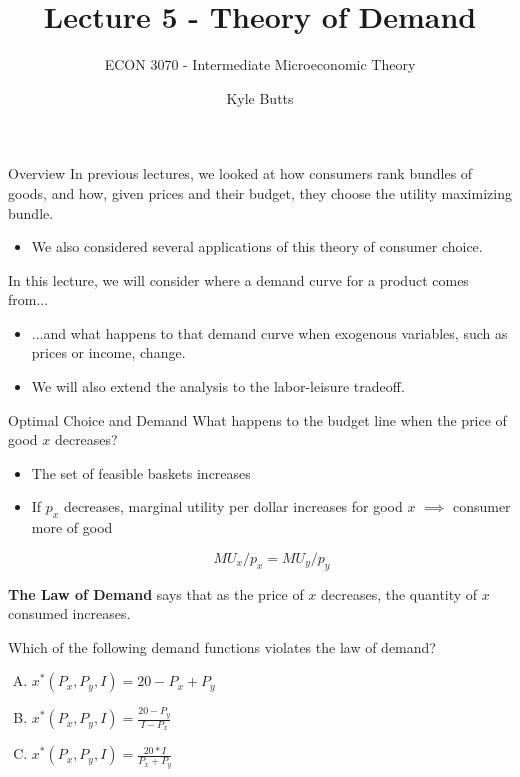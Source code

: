 \documentclass[11pt,t]{beamer}
\author{Kyle Butts}
\title{Lecture 5  - Theory of Demand}
\subtitle{ECON 3070 - Intermediate Microeconomic Theory}
\begin{document}
\begin{frame}
\titlepage
\end{frame}


\begin{frame}{Overview}
  In previous lectures, we looked at how consumers rank bundles of goods, and how, given prices and their budget, they choose the utility maximizing bundle.

  \begin{itemize}
    \item We also considered several applications of this theory of consumer choice.
  \end{itemize}

  \bigskip
  In this lecture, we will consider where a demand curve for a product comes from...

  \begin{itemize}
    \item ...and what happens to that demand curve when exogenous variables, such as prices or income, change.

    \item We will also extend the analysis to the labor-leisure tradeoff.
  \end{itemize}
\end{frame}

\begin{frame}{Optimal Choice and Demand}
  What happens to the budget line when the price of good $x$ decreases?

  \bigskip\pause
  \begin{itemize}
    \item The set of feasible baskets increases

    \pause
    \item If $p_x$ decreases, marginal utility per dollar increases for good $x$ $\implies$ consumer more of good 
    
    $$MU_x / p_x = MU_y / p_y$$
  \end{itemize}

  \pause\bigskip
  \textbf{The Law of Demand} says that as the price of $x$ decreases, the quantity of $x$ consumed increases.
\end{frame}

\begin{frame}

\bigskip
Which of the following demand functions violates the law of demand?

\bigskip
\begin{enumerate}[A)]
\item $x^*(P_x, P_y, I) = 20 -P_x +P_y$
\item $x^*(P_x, P_y, I) = \frac{20 - P_y}{I - P_x} $
\item $x^*(P_x, P_y, I) =  \frac{20*I}{P_x + P_y}$
\end{enumerate}
\end{frame}
\end{document}
